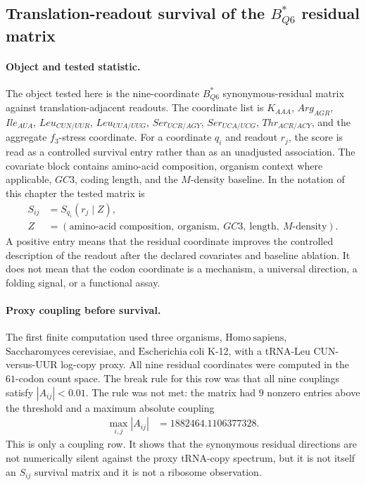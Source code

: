 \subsection{Translation-readout survival of the $B^*_{Q6}$ residual matrix}\label{sec:bioreality-translation-survival-b-star-q6-survival-matrix}

\paragraph{Object and tested statistic.}
The object tested here is the nine-coordinate $B^*_{Q6}$ synonymous-residual matrix against translation-adjacent readouts.  The coordinate list is
$K_{AAA}$, $Arg_{AGR}$, $Ile_{AUA}$, $Leu_{CUN/UUR}$, $Leu_{UUA/UUG}$, $Ser_{UCR/AGY}$, $Ser_{UCA/UCG}$, $Thr_{ACR/ACY}$, and the aggregate $f_3$-stress coordinate.  For a coordinate $q_i$ and readout $r_j$, the score is read as a controlled survival entry rather than as an unadjusted association.  The covariate block contains amino-acid composition, organism context where applicable, $GC3$, coding length, and the $M$-density baseline.  In the notation of this chapter the tested matrix is
$$
\begin{aligned}
S_{ij} &= S_{q_i}(r_j\mid Z),\\
Z &= (\text{amino-acid composition},\ \text{organism},\ GC3,\ \text{length},\ M\text{-density}).
\end{aligned}
$$
A positive entry means that the residual coordinate improves the controlled description of the readout after the declared covariates and baseline ablation.  It does not mean that the codon coordinate is a mechanism, a universal direction, a folding signal, or a functional assay.

\paragraph{Proxy coupling before survival.}
The first finite computation used three organisms, $\mathrm{Homo\ sapiens}$, $\mathrm{Saccharomyces\ cerevisiae}$, and $\mathrm{Escherichia\ coli}$ K-12, with a tRNA-Leu CUN-versus-UUR log-copy proxy.  All nine residual coordinates were computed in the $61$-codon count space.  The break rule for this row was that all nine couplings satisfy $|A_{ij}|<0.01$.  The rule was not met: the matrix had $9$ nonzero entries above the threshold and a maximum absolute coupling
$$
\begin{aligned}
\max_{i,j}|A_{ij}| &= 1882464.1106377328.
\end{aligned}
$$
This is only a coupling row.  It shows that the synonymous residual directions are not numerically silent against the proxy tRNA-copy spectrum, but it is not itself an $S_{ij}$ survival matrix and it is not a ribosome observation.

